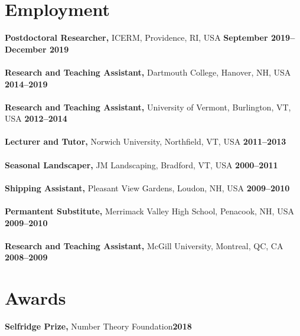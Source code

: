 \documentclass[margin,line]{res}
\begin{document}
\begin{resume}
\section{\sc Employment}
  {\bf Postdoctoral Researcher,} ICERM, Providence, RI, USA
  \hfill {\bf September 2019--December 2019}\\
  \\
  {\bf Research and Teaching Assistant,} Dartmouth College, Hanover, NH, USA
  \hfill {\bf 2014--2019}\\
  \\
  {\bf Research and Teaching Assistant,} University of Vermont, Burlington, VT, USA \hfill {\bf 2012--2014}\\
  \\
  {\bf Lecturer and Tutor,} Norwich University, Northfield, VT, USA \hfill {\bf 2011--2013}\\
  \\
  {\bf Seasonal Landscaper,} JM Landscaping, Bradford, VT, USA \hfill {\bf 2000--2011}\\
  \\
  {\bf Shipping Assistant,} Pleasant View Gardens, Loudon, NH, USA \hfill {\bf 2009--2010}\\
  \\
  {\bf Permantent Substitute,} Merrimack Valley High School, Penacook, NH, USA \hfill {\bf 2009--2010}\\
  \\
  {\bf Research and Teaching Assistant,} McGill University, Montreal, QC, CA \hfill {\bf 2008--2009}\\

\vspace{-1em}


\section{\sc Awards}
  {\bf Selfridge Prize,} Number Theory Foundation\hfill {\bf 2018}\\


\end{resume}
\end{document}
